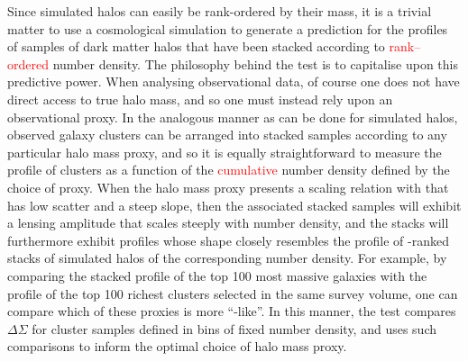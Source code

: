 \documentclass[fleqn,usenatbib,useAMS]{mnras}
\begin{document}
    Since simulated halos can easily be rank-ordered by their mass, it is a trivial matter to use a
    cosmological simulation to generate a prediction for the \dsigma{} profiles of samples of dark
    matter halos that have been stacked according to \textcolor{red}{rank--ordered} number density.
    The philosophy behind the \topn{} test is to capitalise upon this predictive power.
    When analysing observational data, of course one does not have direct access to true halo mass, 
    and so one must instead rely upon an observational proxy. 
    In the analogous manner as can be done for simulated halos, observed galaxy clusters can be
    arranged into stacked samples according to any particular halo mass proxy, and so it is equally
    straightforward to measure the \dsigma{} profile of clusters as a function of the 
    \textcolor{red}{cumulative} number density
    defined by the choice of proxy. 
    When the halo mass proxy presents a scaling relation with \mvir{} that has low scatter and a
    steep slope, then the associated stacked samples will exhibit a lensing amplitude that scales
    steeply with number density, and the stacks will furthermore exhibit \dsigma{} profiles whose
    shape closely resembles the profile of \mvir{}-ranked stacks of simulated halos of the
    corresponding number density.
    For example, by comparing the stacked \dsigma{} profile of the top 100 most massive galaxies
    with the \dsigma{} profile of the top 100 richest clusters selected in the same survey volume,
    one can compare which of these proxies is more ``\mvir{}-like''.
    In this manner, the \topn{} test compares $\Delta\Sigma$ for cluster samples defined in bins of
    fixed number density, and uses such comparisons to inform the optimal choice of halo mass proxy.
    
\end{document}
